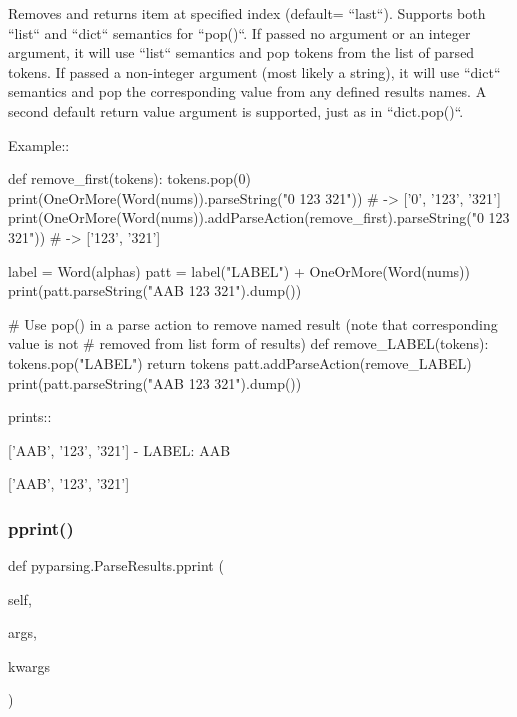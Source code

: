 \begin{DoxyVerb}Removes and returns item at specified index (default= ``last``).
Supports both ``list`` and ``dict`` semantics for ``pop()``. If
passed no argument or an integer argument, it will use ``list``
semantics and pop tokens from the list of parsed tokens. If passed
a non-integer argument (most likely a string), it will use ``dict``
semantics and pop the corresponding value from any defined results
names. A second default return value argument is supported, just as in
``dict.pop()``.

Example::

    def remove_first(tokens):
tokens.pop(0)
    print(OneOrMore(Word(nums)).parseString("0 123 321")) # -> ['0', '123', '321']
    print(OneOrMore(Word(nums)).addParseAction(remove_first).parseString("0 123 321")) # -> ['123', '321']

    label = Word(alphas)
    patt = label("LABEL") + OneOrMore(Word(nums))
    print(patt.parseString("AAB 123 321").dump())

    # Use pop() in a parse action to remove named result (note that corresponding value is not
    # removed from list form of results)
    def remove_LABEL(tokens):
tokens.pop("LABEL")
return tokens
    patt.addParseAction(remove_LABEL)
    print(patt.parseString("AAB 123 321").dump())

prints::

    ['AAB', '123', '321']
    - LABEL: AAB

    ['AAB', '123', '321']
\end{DoxyVerb}
 \mbox{\label{classpyparsing_1_1ParseResults_af7156d4707a1e2388831839e12ec6305}} 
\subsubsection{\texorpdfstring{pprint()}{pprint()}}
{\footnotesize\ttfamily def pyparsing.\+Parse\+Results.\+pprint (\begin{DoxyParamCaption}\item[{}]{self,  }\item[{}]{args,  }\item[{}]{kwargs }\end{DoxyParamCaption})}

